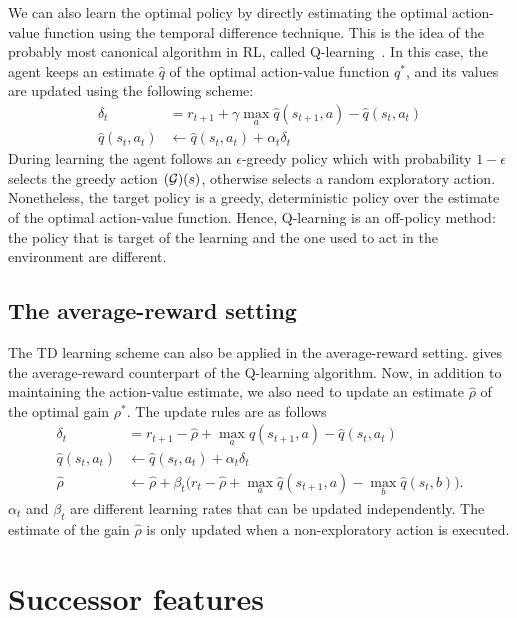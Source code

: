 We can also learn the optimal policy by directly estimating the optimal action-value function using the temporal difference technique. This is the idea of the probably most canonical algorithm in RL, called Q-learning~\citep{Watkins1992}. In this case, the agent keeps an estimate $\widehat q$ of the optimal action-value function $q^*$, and its values are updated using the following scheme:
\begin{align}
  \delta_t &= r_{t+1} + \gamma \max_a \widehat  q(s_{t+1}, a) - \widehat q(s_t, a_t) \\
  \widehat q(s_t, a_t) &\gets \widehat q(s_t, a_t) + \alpha_t \delta_t
  \label{eq:qlearning}
\end{align}
During learning the agent follows an $\epsilon$-greedy policy which with probability $1-\epsilon$ selects the greedy action $(\mathcal{G})(s)$, otherwise selects a random exploratory action.
Nonetheless, the target policy is a greedy, deterministic policy over the estimate of the optimal action-value function. Hence, Q-learning is an off-policy method: the policy that is target of the learning and the one used to act in the environment are different.

\subsection{The average-reward setting}

The TD learning scheme can also be applied in the average-reward setting. \citet{Mahadevan1996} gives the average-reward counterpart of the Q-learning algorithm. Now, in addition to maintaining the action-value estimate, we also need to update an estimate $\widehat\rho$ of the optimal gain $\rho^*$. The update rules are as follows
\begin{align}
  \delta_t &= r_{t+1} - \widehat\rho +  \max_a \widehat q(s_{t+1}, a)  - \widehat q(s_t, a_t) \\
  \widehat q(s_t, a_t) &\gets \widehat q(s_t, a_t) + \alpha_t \delta_t \\
  \widehat \rho &\gets \widehat\rho + \beta_t \big(r_t - \widehat\rho + \max_a \widehat q(s_{t+1}, a) - \max_b \widehat q (s_t, b) \big).
  \label{eq:rlearning}
\end{align}
$\alpha_t$ and $\beta_t$ are different learning rates that can be updated independently. The estimate of the gain $\widehat\rho$ is only updated when a non-exploratory action is executed.

\section{Successor features} 
\label{section:successor_features}


